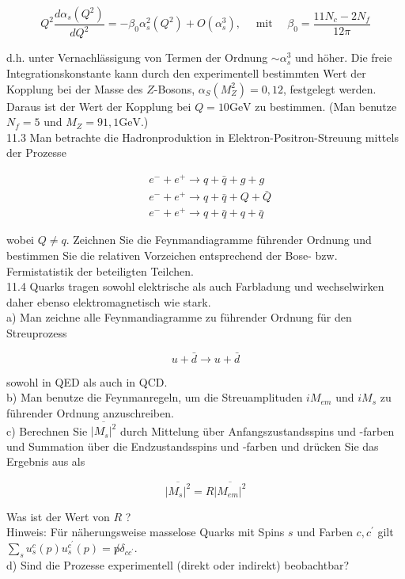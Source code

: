 \documentclass[10pt, letterpaper]{article}
\begin{document}
$$
Q^{2} \frac{d \alpha_{s}\left(Q^{2}\right)}{d Q^{2}}=-\beta_{0} \alpha_{s}^{2}\left(Q^{2}\right)+O\left(\alpha_{s}^{3}\right), \quad \text { mit } \quad \beta_{0}=\frac{11 N_{c}-2 N_{f}}{12 \pi}
$$

d.h. unter Vernachlässigung von Termen der Ordnung $\sim \alpha_{s}^{3}$ und höher. Die freie Integrationskonstante kann durch den experimentell bestimmten Wert der Kopplung bei der Masse des $Z$-Bosons, $\alpha_{S}\left(M_{Z}^{2}\right)=0,12$, festgelegt werden. Daraus ist der Wert der Kopplung bei $Q=10 \mathrm{GeV}$ zu bestimmen. (Man benutze $N_{f}=5$ und $M_{Z}=91,1 \mathrm{GeV}$.)\\
11.3 Man betrachte die Hadronproduktion in Elektron-Positron-Streuung mittels der Prozesse

$$
\begin{aligned}
& e^{-}+e^{+} \longrightarrow q+\bar{q}+g+g \\
& e^{-}+e^{+} \longrightarrow q+\bar{q}+Q+\bar{Q} \\
& e^{-}+e^{+} \longrightarrow q+\bar{q}+q+\bar{q}
\end{aligned}
$$

wobei $Q \neq q$. Zeichnen Sie die Feynmandiagramme führender Ordnung und bestimmen Sie die relativen Vorzeichen entsprechend der Bose- bzw. Fermistatistik der beteiligten Teilchen.\\
11.4 Quarks tragen sowohl elektrische als auch Farbladung und wechselwirken daher ebenso elektromagnetisch wie stark.\\
a) Man zeichne alle Feynmandiagramme zu führender Ordnung für den Streuprozess

$$
u+\bar{d} \longrightarrow u+\bar{d}
$$

sowohl in QED als auch in QCD.\\
b) Man benutze die Feynmanregeln, um die Streuamplituden $i M_{e m}$ und $i M_{s}$ zu führender Ordnung anzuschreiben.\\
c) Berechnen Sie $\overline{\left|M_{s}\right|^{2}}$ durch Mittelung über Anfangszustandsspins und -farben und Summation über die Endzustandsspins und -farben und drücken Sie das Ergebnis aus als

$$
\overline{\left|M_{s}\right|^{2}}=R \overline{\left|M_{e m}\right|^{2}}
$$

Was ist der Wert von $R$ ?\\
Hinweis: Für näherungsweise masselose Quarks mit Spins $s$ und Farben $c, c^{\prime}$ gilt $\sum_{s} u_{s}^{c}(p) u_{s}^{c^{\prime}}(p)=\not p \delta_{c c^{\prime}}$.\\
d) Sind die Prozesse experimentell (direkt oder indirekt) beobachtbar?
\end{document}
